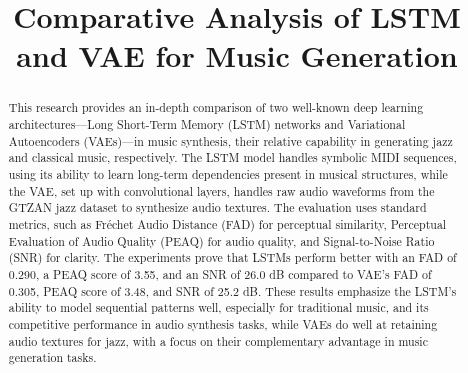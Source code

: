 \documentclass[conference]{IEEEtran}
\begin{document}
\title{Comparative Analysis of LSTM and VAE for Music Generation}

\author{
\and
{}
\and
{}
\and
{}
\and
{}
\and
{}
}

\maketitle

\begin{abstract}
This research provides an in-depth comparison of two well-known deep learning architectures—Long Short-Term Memory (LSTM) networks and Variational Autoencoders (VAEs)—in music synthesis, their relative capability in generating jazz and classical music, respectively. The LSTM model handles symbolic MIDI sequences, using its ability to learn long-term dependencies present in musical structures, while the VAE, set up with convolutional layers, handles raw audio waveforms from the GTZAN jazz dataset to synthesize audio textures. The evaluation uses standard metrics, such as Fréchet Audio Distance (FAD) for perceptual similarity, Perceptual Evaluation of Audio Quality (PEAQ) for audio quality, and Signal-to-Noise Ratio (SNR) for clarity. The experiments prove that LSTMs perform better with an FAD of 0.290, a PEAQ score of 3.55, and an SNR of 26.0 dB compared to VAE's FAD of 0.305, PEAQ score of 3.48, and SNR of 25.2 dB. These results emphasize the LSTM's ability to model sequential patterns well, especially for traditional music, and its competitive performance in audio synthesis tasks, while VAEs do well at retaining audio textures for jazz, with a focus on their complementary advantage in music generation tasks.
\end{abstract}
\end{document}
